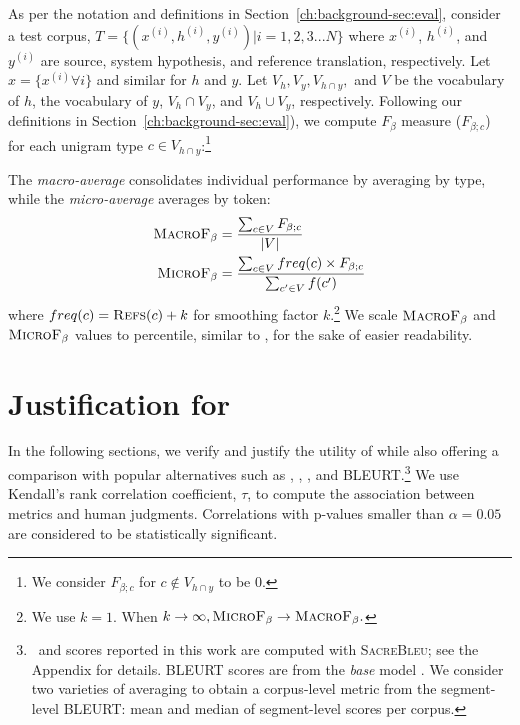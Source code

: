 As per the notation and definitions in Section~\ref{ch:background-sec:eval}, consider a test corpus, $T = \{ (x^{(i)}, h^{(i)}, y^{(i)}) | i = 1,2,3 ... N \}$ where $x^{(i)}$, $h^{(i)}$, and $y^{(i)}$ are source, system hypothesis, and reference translation, respectively. Let $x = \{x^{(i)} \forall i\}$ and similar for $h$ and $y$.  Let $V_h, V_y, V_{h\cap y},$ and $V$ be the vocabulary of $h$, the vocabulary of $y$, $V_h \cap V_y$, and $V_h \cup V_y$, respectively.
Following our definitions in Section~\ref{ch:background-sec:eval}), we compute $F_\beta$ measure ($F_{\beta;c}$) for each unigram type $c \in V_{h \cap y}$:\footnote{We consider $F_{\beta;c}$ for $c \not\in V_{h \cap y}$ to be 0.}

The \textit{macro-average} consolidates individual performance by averaging by type, while the \textit{micro-average} averages by token:
\begin{align*}
\textsc{MacroF}{\text{$_{{\beta}}$}} &= \frac{\sum_{c \in V} F_{\beta;c}} {|V|}\\
\textsc{MicroF}{\text{$_{{\beta}}$}} &= \frac{\sum_{c\in V} freq(c) \times F_{\beta;c}} {\sum_{c'\in V} f(c')}
\end{align*}
\noindent where $freq(c) = \textsc{Refs}(c)+k$ for smoothing factor $k$.\footnote{We use $k=1$. When $k \rightarrow \infty, \space \textsc{MicroF}{\text{$_{{\beta}}$}} \rightarrow \textsc{MacroF}{\text{$_{{\beta}}$}}. $} We scale $\textsc{MacroF}{\text{$_{{\beta}}$}}$ and $\textsc{MicroF}{\text{$_{{\beta}}$}}$ values to percentile, similar to \bleu, for the sake of easier readability.

\section{Justification for \texorpdfstring{}{MacroF1}}
\label{sec:justific}

In the following sections, we verify and justify the utility of  while also offering a comparison with popular alternatives such as , \bleu, , and BLEURT.\footnote{\bleu\ and  scores reported in this work are computed with \textsc{SacreBleu}; see the Appendix for details.
BLEURT scores are from the \textit{base} model \citep{sellam-etal-2020-bleurt}. We consider two varieties of averaging to obtain a corpus-level metric from the segment-level BLEURT: mean and median of segment-level scores per corpus.}
We use Kendall's rank correlation coefficient, $\tau$, to compute the association between metrics and human judgments.
Correlations with p-values smaller than $\alpha=0.05$ are considered to be statistically significant.

